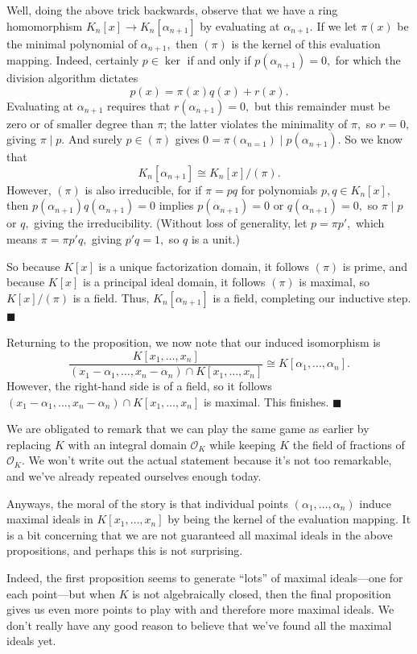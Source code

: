 Well, doing the above trick backwards, observe that we have a ring homomorphism $K_n[x]\to K_n[\alpha_{n+1}]$ by evaluating at $\alpha_{n+1}.$ If we let $\pi(x)$ be the minimal polynomial of $\alpha_{n+1},$ then $(\pi)$ is the kernel of this evaluation mapping. Indeed, certainly $p\in\ker$ if and only if $p(\alpha_{n+1})=0,$ for which the division algorithm dictates
\[p(x)=\pi(x)q(x)+r(x).\]
Evaluating at $\alpha_{n+1}$ requires that $r(\alpha_{n+1})=0,$ but this remainder must be zero or of smaller degree than $\pi$; the latter violates the minimality of $\pi,$ so $r=0,$ giving $\pi\mid p.$ And surely $p\in(\pi)$ gives $0=\pi(\alpha_{n=1})\mid p(\alpha_{n+1}).$ So we know that
\[K_n[\alpha_{n+1}]\cong K_n[x]/(\pi).\]
However, $(\pi)$ is also irreducible, for if $\pi=pq$ for polynomials $p,q\in K_n[x],$ then $p(\alpha_{n+1})q(\alpha_{n+1})=0$ implies $p(\alpha_{n+1})=0$ or $q(\alpha_{n+1})=0,$ so $\pi\mid p$ or $q,$ giving the irreducibility. (Without loss of generality, let $p=\pi p',$ which means $\pi=\pi p'q,$ giving $p'q=1,$ so $q$ is a unit.)

So because $K[x]$ is a unique factorization domain, it follows $(\pi)$ is prime, and because $K[x]$ is a principal ideal domain, it follows $(\pi)$ is maximal, so $K[x]/(\pi)$ is a field. Thus, $K_n[\alpha_{n+1}]$ is a field, completing our inductive step. $\blacksquare$

Returning to the proposition, we now note that our induced isomorphism is
\[\frac{K[x_1,\ldots,x_n]}{(x_1-\alpha_1,\ldots,x_n-\alpha_n)\cap K[x_1,\ldots,x_n]}\cong K[\alpha_1,\ldots,\alpha_n].\]
However, the right-hand side is of a field, so it follows $(x_1-\alpha_1,\ldots,x_n-\alpha_n)\cap K[x_1,\ldots,x_n]$ is maximal. This finishes. $\blacksquare$

We are obligated to remark that we can play the same game as earlier by replacing $K$ with an integral domain $\mathcal O_K$ while keeping $K$ the field of fractions of $\mathcal O_K.$ We won't write out the actual statement because it's not too remarkable, and we've already repeated ourselves enough today.

Anyways, the moral of the story is that individual points $(\alpha_1,\ldots,\alpha_n)$ induce maximal ideals in $K[x_1,\ldots,x_n]$ by being the kernel of the evaluation mapping. It is a bit concerning that we are not guaranteed all maximal ideals in the above propositions, and perhaps this is not surprising.

Indeed, the first proposition seems to generate ``lots'' of maximal ideals---one for each point---but when $K$ is not algebraically closed, then the final proposition gives us even more points to play with and therefore more maximal ideals. We don't really have any good reason to believe that we've found all the maximal ideals yet.

